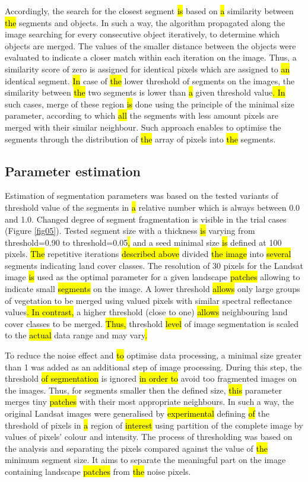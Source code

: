 \documentclass[sustainability,article,submit,pdftex,moreauthors]{Definitions/mdpi}
\begin{document}
Accordingly, the search for the closest segment \hl{is} based on \hl{a} similarity between \hl{the }segments and objects. In such a way, the algorithm propagated along the image searching for every consecutive object iteratively, to determine which objects are merged. The values of the smaller distance between the objects were evaluated to indicate a closer match within each iteration on the image. Thus, a similarity score of zero is assigned for identical pixels which are assigned to \hl{an }identical segment. \hl{In }case of \hl{the }lower threshold of segments on the images, the similarity between \hl{the }two segments is lower than \hl{a} given threshold value\hl{. In} such cases,\hl{ }merge of these region \hl{is} done using the principle of the minimal size parameter, according to which \hl{all }the segments with less amount pixels are merged with their similar neighbour. Such approach enables to optimise the segments through the distribution of \hl{the} array of pixels into \hl{the }segments.

\subsection{Parameter estimation}

Estimation of segmentation parameters was based on the tested variants of threshold value of the segments in \hl{a }relative number which is always between 0.0 and 1.0. Changed degree of segment fragmentation is visible in the trial cases (Figure \ref{fig05}). Tested segment size with a thickness \hl{is }varying from threshold=0.90 to threshold=0.05\hl{, }and a seed minimal size \hl{is }defined at 100 pixels. \hl{The }repetitive iterations \hl{described above }divided \hl{the image} into \hl{several }segments indicating land cover classes. The resolution of 30 pixels for the Landsat image \hl{is} used as the optimal parameter for a given landscape \hl{patches} allowing to indicate small \hl{segments} on the image. A lower threshold \hl{allows} only large groups of vegetation to be merged using valued pixels with similar spectral reflectance values\hl{. In contrast,} a higher threshold (close to one)\hl{ allows} neighbouring land cover classes to be merged. \hl{Thus, }threshold \hl{level }of image segmentation is scaled to the\hl{ actual }data range and may vary\hl{.} 

To reduce the noise effect and \hl{to }optimise data processing, a minimal size greater than 1 was added as an additional step of image processing. During this step, the threshold \hl{of segmentation }is ignored \hl{in order to }avoid too fragmented images on the images. Thus, for\hl{ }segments smaller then the defined size, \hl{this} parameter merges tiny \hl{patches} with their most appropriate neighbours. In such a way, the original Landsat images were generalised by \hl{experimental }defining \hl{of }the threshold of pixels in \hl{a} region of \hl{interest} using partition of the complete image by values of pixels' colour and intensity. The process of thresholding was based on the analysis and separating the pixels compared against the value of \hl{the }minimum segment size. It aims to separate the meaningful part on the image containing landscape \hl{patches} from \hl{the }noise pixels.
\end{document}
